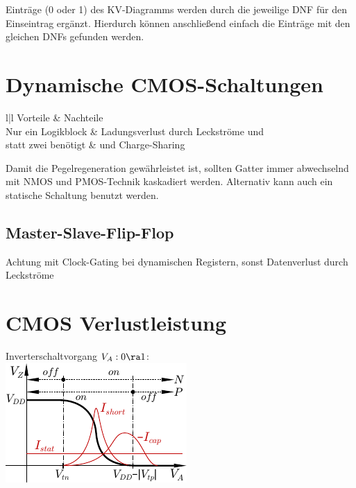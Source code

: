 \documentclass[english]{latex4ei/latex4ei_sheet}
\begin{document}
Einträge (0 oder 1) des KV-Diagramms werden durch die jeweilige DNF für den Einseintrag ergänzt. Hierdurch können anschließend einfach die Einträge mit den gleichen DNFs gefunden werden.


\section{Dynamische CMOS-Schaltungen}

\begin{tablebox}{l|l}
	Vorteile & Nachteile\\
	\brule
	Nur ein Logikblock & Ladungsverlust durch Leckströme und\\
	statt zwei benötigt & und Charge-Sharing\\
	
\end{tablebox}

Damit die Pegelregeneration gewährleistet ist, sollten Gatter immer abwechselnd mit NMOS und PMOS-Technik kaskadiert werden. Alternativ kann auch ein statische Schaltung benutzt werden.


\subsection{Master-Slave-Flip-Flop}


Achtung mit Clock-Gating bei dynamischen Registern, sonst Datenverlust durch Leckströme

\section{CMOS Verlustleistung}
Inverterschaltvorgang $V_A: 0 \ra 1$:\\
\includegraphics{img/ds/char_inverter.pdf}
\end{document}
